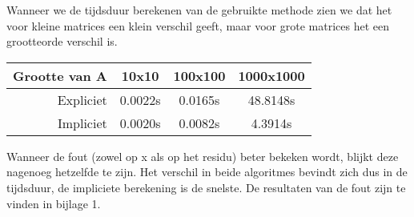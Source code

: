 Wanneer we de tijdsduur berekenen van de gebruikte methode zien we dat het voor kleine matrices een klein verschil geeft, maar voor grote matrices het een grootteorde verschil is.\\[12pt]

\centering
\begin{tabular}{|r|c|c|c|}
\hline
Grootte van A & 10x10 & 100x100 & 1000x1000\\ \hline
Expliciet & 0.0022s & 0.0165s & 48.8148s\\ \hline
Impliciet & 0.0020s & 0.0082s & 4.3914s\\ \hline
\end{tabular}
\centering
{}
\label{Tijd Householder}

\begin{flushleft}
Wanneer de fout (zowel op x als op het residu) beter bekeken wordt, blijkt deze nagenoeg hetzelfde te zijn. Het verschil in beide algoritmes bevindt zich dus in de tijdsduur, de impliciete berekening is de snelste. De resultaten van de fout zijn te vinden in bijlage 1.\\[12pt]
\end{flushleft}
